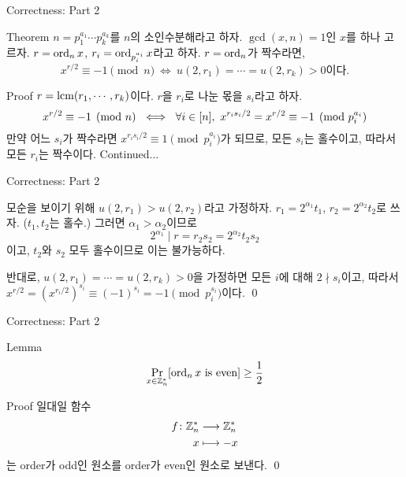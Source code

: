 \documentclass[../240513_msquare_shor.tex]{subfiles}
\begin{document}
\begin{frame}{Correctness: Part 2}
    \begin{block}{Theorem}
        \(n = p_1^{a_1} \cdots p_k^{a_k}\)를 \(n\)의 소인수분해라고 하자.
        \(\gcd(x, n) = 1\)인 \(x\)를 하나 고르자.
        \(r = \operatorname{ord}_n x\), \(r_i = \operatorname{ord}_{p_i^{a_i}} x\)라고 하자.
        \(r = \operatorname{ord}_n\)가 짝수라면,
        \[
            x^{r/2} \equiv -1 \pmod{n}
            \:\iff\: u(2, r_1) = \cdots = u(2, r_k) > 0\text{이다.}
        \]
    \end{block}
    \pause
    \begin{exampleblock}{Proof}
        \(r = \mathrm{lcm}(r_1, \cdots, r_k)\)이다.
        \(r\)을 \(r_i\)로 나눈 몫을 \(s_i\)라고 하자.
        \[
            x^{r/2} \equiv -1 \pmod{n} \text{ }\iff\text{ }
            \forall i \in [n],\text{ } x^{r_i s_i / 2} = x^{r/2} \equiv -1 \pmod{p_i^{a_i}}
        \]
        만약 어느 \(s_i\)가 짝수라면 \(x^{r_i s_i / 2} \equiv 1 \pmod{p_i^{a_i}}\)가 되므로,
        모든 \(s_i\)는 홀수이고, 따라서 모든 \(r_i\)는 짝수이다.
        \hfill Continued...
    \end{exampleblock}
\end{frame}

\begin{frame}{Correctness: Part 2}
    \begin{exampleblock}{}
        모순을 보이기 위해 \(u(2, r_1) > u(2, r_2)\)라고 가정하자.
        \(r_1 = 2^{\alpha_1} t_1\), \(r_2 = 2^{\alpha_2} t_2\)로 쓰자. (\(t_1, t_2\)는 홀수.)
        그러면 \(\alpha_1 > \alpha_2\)이므로
        \[
            2^{\alpha_1} \mid r = r_2 s_2 = 2^{\alpha_2} t_2 s_2
        \]
        이고, \(t_2\)와 \(s_2\) 모두 홀수이므로 이는 불가능하다.

        \vspace*{1em}
        반대로, \(u(2, r_1) = \cdots = u(2, r_k) > 0\)을 가정하면
        모든 \(i\)에 대해 \(2 \nmid s_i\)이고,
        따라서 \(x^{r/2} = (x^{r_i / 2})^{s_i} \equiv (-1)^{s_i} = -1 \pmod{p_i^{s_i}}\)이다.
        \qed
    \end{exampleblock}
\end{frame}

\begin{frame}{Correctness: Part 2}
    \begin{block}{Lemma}
        \[
            \Pr_{x \in \mathbb{Z}_n^\ast} [ \operatorname{ord}_n x~\text{is even} ] \ge \frac{1}{2}
        \]
    \end{block}
    \begin{exampleblock}{Proof}
        일대일 함수
        \begin{align*}
            f \colon \mathbb{Z}_n^\ast &\longrightarrow \mathbb{Z}_n^\ast \\
            x &\longmapsto -x
        \end{align*}
        는 order가 odd인 원소를 order가 even인 원소로 보낸다. \qed
    \end{exampleblock}
\end{frame}
\end{document}
